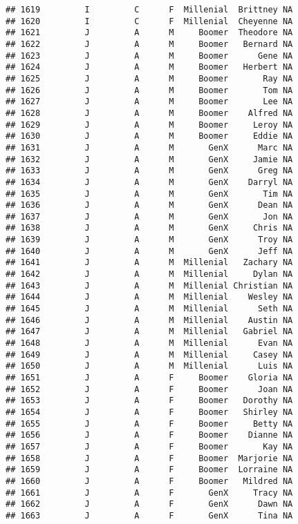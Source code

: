 \documentclass[
]{article}
\begin{document}
\begin{verbatim}
## 1619         I         C      F  Millenial  Brittney NA
## 1620         I         C      F  Millenial  Cheyenne NA
## 1621         J         A      M     Boomer  Theodore NA
## 1622         J         A      M     Boomer   Bernard NA
## 1623         J         A      M     Boomer      Gene NA
## 1624         J         A      M     Boomer   Herbert NA
## 1625         J         A      M     Boomer       Ray NA
## 1626         J         A      M     Boomer       Tom NA
## 1627         J         A      M     Boomer       Lee NA
## 1628         J         A      M     Boomer    Alfred NA
## 1629         J         A      M     Boomer     Leroy NA
## 1630         J         A      M     Boomer     Eddie NA
## 1631         J         A      M       GenX      Marc NA
## 1632         J         A      M       GenX     Jamie NA
## 1633         J         A      M       GenX      Greg NA
## 1634         J         A      M       GenX    Darryl NA
## 1635         J         A      M       GenX       Tim NA
## 1636         J         A      M       GenX      Dean NA
## 1637         J         A      M       GenX       Jon NA
## 1638         J         A      M       GenX     Chris NA
## 1639         J         A      M       GenX      Troy NA
## 1640         J         A      M       GenX      Jeff NA
## 1641         J         A      M  Millenial   Zachary NA
## 1642         J         A      M  Millenial     Dylan NA
## 1643         J         A      M  Millenial Christian NA
## 1644         J         A      M  Millenial    Wesley NA
## 1645         J         A      M  Millenial      Seth NA
## 1646         J         A      M  Millenial    Austin NA
## 1647         J         A      M  Millenial   Gabriel NA
## 1648         J         A      M  Millenial      Evan NA
## 1649         J         A      M  Millenial     Casey NA
## 1650         J         A      M  Millenial      Luis NA
## 1651         J         A      F     Boomer    Gloria NA
## 1652         J         A      F     Boomer      Joan NA
## 1653         J         A      F     Boomer   Dorothy NA
## 1654         J         A      F     Boomer   Shirley NA
## 1655         J         A      F     Boomer     Betty NA
## 1656         J         A      F     Boomer    Dianne NA
## 1657         J         A      F     Boomer       Kay NA
## 1658         J         A      F     Boomer  Marjorie NA
## 1659         J         A      F     Boomer  Lorraine NA
## 1660         J         A      F     Boomer   Mildred NA
## 1661         J         A      F       GenX     Tracy NA
## 1662         J         A      F       GenX      Dawn NA
## 1663         J         A      F       GenX      Tina NA

\end{verbatim}
\end{document}
